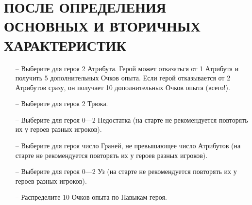 \section{ПОСЛЕ ОПРЕДЕЛЕНИЯ ОСНОВНЫХ И ВТОРИЧНЫХ ХАРАКТЕРИСТИК}
\begin{itemize}
\item[--] Выберите для героя 2 Атрибута. Герой может отказаться от 1 Атрибута и получить 5 дополнительных Очков опыта. Если герой отказывается от 2 Атрибутов сразу, он получает 10 дополнительных Очков опыта (всего!).
\item[--] Выберите для героя 2 Трюка.
\item[--] Выберите для героя 0—2 Недостатка (на старте не рекомендуется повторять их у героев разных игроков).
\item[--] Выберите для героя число Граней, не превышающее число Атрибутов (на старте не рекомендуется повторять их у героев разных игроков).
\item[--] Выберите для героя 0—2 Уз (на старте не рекомендуется повторять их у героев разных игроков).
\item[--] Распределите 10 Очков опыта по Навыкам героя.
\end{itemize}